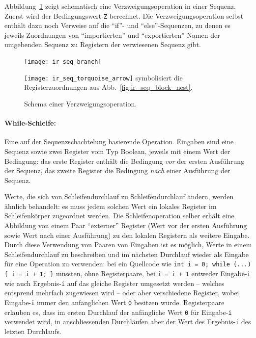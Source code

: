 \documentclass[twoside,a4paper,fleqn,12pt]{book}
\begin{document}
Abbildung~\ref{fig:ir_seq_branch} zeigt schematisch eine Verzweigungsoperation in einer Sequenz.
Zuerst wird der Bedingungswert \texttt{Z} berechnet. Die Verzweigungsoperation selbst enthält dazu noch
Verweise auf die ``if''- und ``else''-Sequenzen, zu denen es jeweils Zuordnungen von "`importierten"' und "`exportierten"' 
Namen der umgebenden Sequenz zu Registern der verwiesenen Sequenz gibt.

\begin{figure}[h]
   \centering
  \texttt{[image: ir\_seq\_branch]}
  \caption{Schema einer Verzweigungsoperation.}
  \small\texttt{[image: ir\_seq\_torquoise\_arrow]} symbolisiert die Registerzuordnungen aus Abb.~\ref{fig:ir_seq_block_nest}.
  \label{fig:ir_seq_branch}
\end{figure}


\paragraph{While-Schleife:} Eine auf der Sequenzschachtelung basierende Operation. Eingaben sind eine Sequenz sowie zwei Register vom
Typ Boolean, jeweils mit einem Wert der Bedingung: das erste Register enthält die Bedingung \emph{vor} der ersten Ausführung der Sequenz,
das zweite Register die Bedingung \emph{nach} einer Ausführung der Sequenz.

Werte, die sich von Schleifendurchlauf zu Schleifendurchlauf ändern, werden ähnlich behandelt: es muss jedem solchen Wert ein lokales
Register im Schleifenkörper zugeordnet werden. Die Schleifenoperation selber erhält eine Abbildung von einem Paar "`externer"' Register
(Wert vor der ersten Ausführung sowie Wert nach einer Ausführung) zu den lokalen Registern als weitere Eingabe.
Durch diese Verwendung von Paaren von Eingaben ist es möglich, Werte in einem Schleifendurchlauf zu beschreiben
und im nächsten Durchlauf wieder als Eingabe für eine Operation zu verwenden: bei ein Quellcode wie 
\texttt{int i = 0; while (...) \{ i = i + 1; \}} müssten, ohne Registerpaare, bei \texttt{i = i + 1} entweder Eingabe-\texttt{i}
wie auch Ergebnis-\texttt{i} auf das gleiche Register umgesetzt werden -- welches entsprend mehrfach zugewiesen wird -- oder aber verschiedene Register, wobei
Eingabe-\texttt{i} immer den anfänglichen Wert \texttt{0} besitzen würde. Registerpaare erlauben es, dass im ersten Durchlauf
der anfängliche Wert \texttt{0} für Eingabe-\texttt{i} verwendet wird, in anschliessenden Durchläufen aber der Wert des Ergebnis-\texttt{i}
des letzten Durchlaufs.
\end{document}
